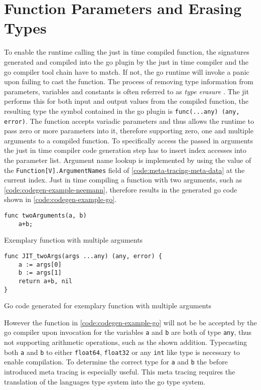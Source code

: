 \section{Function Parameters and Erasing Types}

To enable the runtime calling the just in time compiled function, the
signatures generated and compiled into the go plugin by the just in time
compiler and the go compiler tool chain have to match. If not, the go runtime
will invoke a panic upon failing to cast the function. The process of removing
type information from parameters, variables and constants is often referred to
as \textit{type erasure} \cite[A.2 Type erasure]{crary2002intensional}. The jit
performs this for both input and output values from the compiled function, the
resulting type the symbol contained in the go plugin is
\texttt{func(...any) (any, error)}. The function accepts variadic
parameters and thus allows the runtime to pass zero or more parameters into it,
therefore supporting zero, one and multiple arguments to a compiled function.
To specifically access the passed in arguments the just in time compiler code
generation step has to insert index accesses into the parameter list. Argument
name lookup is implemented by using the value of the
\texttt{Function[V].ArgumentNames} field of
\autoref{code:meta-tracing-meta-data} at the current index. Just in time
compiling a function with two arguments, such as
\autoref{code:codegen-example-neemann}, therefore results in the generated go
code shown in \autoref{code:codegen-example-go}.

\begin{listing}[H]
    \begin{verbatim}
func twoArguments(a, b)
    a+b;
    \end{verbatim}
    \caption{Exemplary function with multiple arguments}
    \label{code:codegen-example-neemann}
\end{listing}

\begin{listing}[H]
    \begin{verbatim}
func JIT_twoArgs(args ...any) (any, error) { 
    a := args[0]
    b := args[1]
    return a+b, nil
}
    \end{verbatim}
    \caption{Go code generated for exemplary function with multiple arguments}
    \label{code:codegen-example-go}
\end{listing}

However the function in \autoref{code:codegen-example-go} will not be be
accepted by the go compiler upon invocation for the variables \texttt{a} and
\texttt{b} are both of type \texttt{any}, thus not supporting
arithmetic operations, such as the shown addition. Typecasting both \texttt{a}
and \texttt{b} to either \texttt{float64}, \texttt{float32} or
any \texttt{int} like type is necessary to enable compilation. To
determine the correct type for \texttt{a} and \texttt{b} the before introduced
meta tracing is especially useful. This meta tracing requires the translation
of the languages type system into the go type system.

